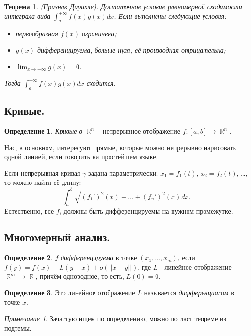 \documentclass[a4paper,100pt]{article}
\theoremstyle{indented}
\newtheorem{theorem}{Теорема}
\theoremstyle{definition}
\newtheorem{defn}{Определение}
\theoremstyle{remark}
\newtheorem{remark}{Примечание}
\DeclareMathOperator{\RR}{\mathbb{R}}
\begin{document}
\begin{theorem}
    (Признак Дирихле). Достаточное условие равномерной сходимости интеграла вида $\int_a^{+\infty}f(x)g(x)dx$. Если выполнены следующие условия: 

    \begin{itemize}
        \item первообразная $f(x)$ ограничена; 
        \item $g(x)$ дифференцируема, больше нуля, её производная отрицательна; 
        \item $\lim_{x\rightarrow +\infty} g(x)=0$. 
    \end{itemize}

    Тогда $\int_a^{+\infty}f(x)g(x)dx$ сходится.
\end{theorem}

\subsection{Кривые.}

\begin{defn}
    \textit{Кривые в $\RR^n$} - непрерывное отображение $f:[a, b]\rightarrow \RR^n$.
\end{defn}

Нас, в основном, интересуют прямые, которые можно непрерывно нарисовать одной линией, если говорить на простейшем языке. \ 

Если непрерывная кривая $\gamma$ задана параметрически: $x_1=f_1(t)$, $x_2=f_2(t)$, \dots, то можно найти её длину:
\[
    \int_a^b\sqrt{(f_1')^2(x)+\ldots+(f_n')^2(x)}dx. 
\]
Естественно, все $f_i$ должны быть дифференцируемы на нужном промежутке.

\subsection{Многомерный анализ.} 

\begin{defn}
    $f$ \textit{дифференцируема} в точке $(x_1, \ldots, x_m)$, если $f(y)=f(x)+L(y-x)+o(||x-y||)$, где $L$ - линейное отображение $\RR^m\rightarrow \RR$, причём однородное, то есть, $L(0)=0$.
\end{defn}

\begin{defn}
    Это линейное отображение $L$ называется \textit{дифференциалом} в точке $x$.
\end{defn}

\begin{remark}
    Зачастую ищем по определению, можно по ласт теореме из подтемы.
\end{remark}
\end{document}
